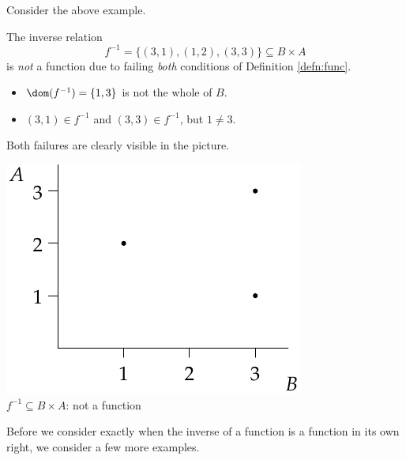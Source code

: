 \begin{example}[cont.]
Consider the above example.\\[5pt]
\noindent\begin{minipage}{0.62\textwidth}
The inverse relation
\[f^{-1}=\{(3,1),(1,2),(3,3)\}\subseteq B\times A\]
is \emph{not} a function due to failing \emph{both} conditions of Definition \ref{defn:func}.
\begin{itemize}
  \item $\dom(f^{-1})=\{1,3\}$ is not the whole of $B$.
  \item $(3,1)\in f^{-1}$ and $(3,3)\in f^{-1}$, but $1\neq 3$.
\end{itemize}
Both failures are clearly visible in the picture.
\end{minipage}\hfill\begin{minipage}{0.33\textwidth}
\centering
\includegraphics[width=\textwidth]{relations-19-reln1}\\
$f^{-1}\subseteq B\times A$: not a function
\end{minipage}
\end{example}

\noindent Before we consider exactly when the inverse of a function is a function in its own right, we consider a few more examples.


